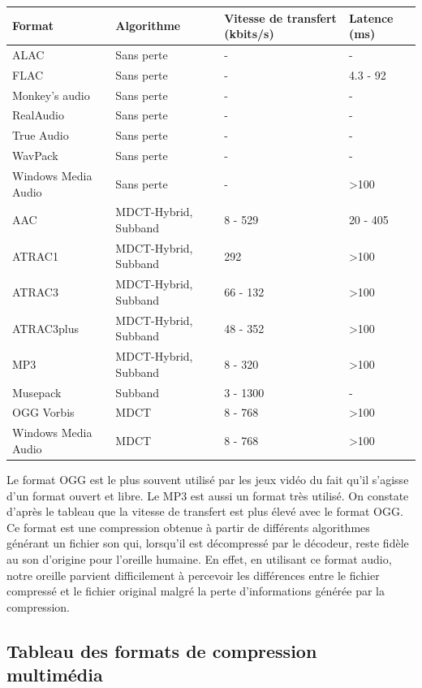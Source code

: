 \documentclass[a4paper, 11pt]{article} %
\begin{document}
\begin{center}
	\begin{tabular}{|p{}|p{}|p{}|p{}|}
		\hline
		Format & Algorithme & Vitesse de transfert (kbits/s) & Latence (ms)\\
		\hline
		ALAC & Sans perte & - & -\\
		FLAC & Sans perte & - & 4.3 - 92\\
		Monkey's audio & Sans perte & - & -\\
		RealAudio & Sans perte & - & - \\
		True Audio & Sans perte & - & - \\
		WavPack & Sans perte & - & - \\
		Windows Media Audio & Sans perte & - & >100\\
		\hline
		AAC & MDCT-Hybrid, Subband & 8 - 529 & 20 - 405\\
		ATRAC1 & MDCT-Hybrid, Subband & 292 & >100\\
		ATRAC3 & MDCT-Hybrid, Subband & 66 - 132 & >100\\
		ATRAC3plus & MDCT-Hybrid, Subband & 48 - 352 & >100\\
		MP3 & MDCT-Hybrid, Subband & 8 - 320 & >100\\
		Musepack & Subband & 3 - 1300 & - \\
		OGG Vorbis & MDCT & 8 - 768 & >100\\
		Windows Media Audio & MDCT & 8 - 768 & >100\\
		\hline
	\end{tabular}
\end{center}

Le format OGG est le plus souvent utilisé par les jeux vidéo du fait qu'il s'agisse d'un format ouvert et libre. Le MP3 est aussi un format très utilisé. On constate d'après le tableau que la vitesse de transfert est plus élevé avec le format OGG. Ce format est une compression obtenue à partir de différents algorithmes générant un fichier son qui, lorsqu'il est décompressé par le décodeur, reste fidèle au son d'origine pour l'oreille humaine. En effet, en utilisant ce format audio, notre oreille parvient difficilement à percevoir les différences entre le fichier compressé et le fichier original malgré la perte d'informations générée par la compression.

\subsection{Tableau des formats de compression multimédia}
\end{document}
